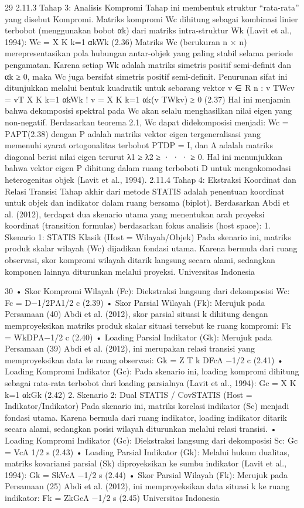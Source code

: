 29
2.11.3 Tahap 3: Analisis Kompromi
Tahap ini membentuk struktur “rata-rata” yang disebut Kompromi. Matriks kompromi
Wc dihitung sebagai kombinasi linier terbobot (menggunakan bobot αk) dari matriks
intra-struktur Wk (Lavit et al., 1994):
Wc =
X
K
k=1
αkWk (2.36)
Matriks Wc (berukuran n × n) merepresentasikan pola hubungan antar-objek yang paling
stabil selama periode pengamatan. Karena setiap Wk adalah matriks simetris positif
semi-definit dan αk ≥ 0, maka Wc juga bersifat simetris positif semi-definit. Penurunan
sifat ini ditunjukkan melalui bentuk kuadratik untuk sebarang vektor v ∈ R
n
:
v
TWcv = vT
 X
K
k=1
αkWk
!
v =
X
K
k=1
αk(v
TWkv) ≥ 0 (2.37)
Hal ini menjamin bahwa dekomposisi spektral pada Wc akan selalu menghasilkan nilai
eigen yang non-negatif. Berdasarkan teorema 2.1, Wc dapat didekomposisi menjadi:
Wc = PΛPT(2.38)
dengan P adalah matriks vektor eigen tergeneralisasi yang memenuhi syarat ortogonalitas
terbobot PTDP = I, dan Λ adalah matriks diagonal berisi nilai eigen terurut λ1 ≥ λ2 ≥
· · · ≥ 0. Hal ini menunjukkan bahwa vektor eigen P dihitung dalam ruang terboboti D
untuk mengakomodasi heterogenitas objek (Lavit et al., 1994).
2.11.4 Tahap 4: Ekstraksi Koordinat dan Relasi Transisi
Tahap akhir dari metode STATIS adalah penentuan koordinat untuk objek dan indikator
dalam ruang bersama (biplot). Berdasarkan Abdi et al. (2012), terdapat dua skenario utama
yang menentukan arah proyeksi koordinat (transition formulas) berdasarkan fokus analisis
(host space):
1. Skenario 1: STATIS Klasik (Host = Wilayah/Objek)
Pada skenario ini, matriks produk skalar wilayah (Wc) dijadikan fondasi utama.
Karena bermula dari ruang observasi, skor kompromi wilayah ditarik langsung
secara alami, sedangkan komponen lainnya diturunkan melalui proyeksi.
Universitas Indonesia

30
• Skor Kompromi Wilayah (Fc): Diekstraksi langsung dari dekomposisi Wc:
Fc = D−1/2PΛ1/2
c
(2.39)
• Skor Parsial Wilayah (Fk): Merujuk pada Persamaan (40) Abdi et al. (2012),
skor parsial situasi k dihitung dengan memproyeksikan matriks produk skalar
situasi tersebut ke ruang kompromi:
Fk = WkDPΛ−1/2
c
(2.40)
• Loading Parsial Indikator (Gk): Merujuk pada Persamaan (39) Abdi et al.
(2012), ini merupakan relasi transisi yang memproyeksikan data ke ruang
observasi:
Gk = Z
T
k DFcΛ
−1/2
c
(2.41)
• Loading Kompromi Indikator (Gc): Pada skenario ini, loading kompromi
dihitung sebagai rata-rata terbobot dari loading parsialnya (Lavit et al., 1994):
Gc =
X
K
k=1
αkGk (2.42)
2. Skenario 2: Dual STATIS / CovSTATIS (Host = Indikator/Indikator)
Pada skenario ini, matriks korelasi indikator (Sc) menjadi fondasi utama. Karena
bermula dari ruang indikator, loading indikator ditarik secara alami, sedangkan
posisi wilayah diturunkan melalui relasi transisi.
• Loading Kompromi Indikator (Gc): Diekstraksi langsung dari dekomposisi
Sc:
Gc = VcΛ
1/2
s
(2.43)
• Loading Parsial Indikator (Gk): Melalui hukum dualitas, matriks kovariansi
parsial (Sk) diproyeksikan ke sumbu indikator (Lavit et al., 1994):
Gk = SkVcΛ
−1/2
s
(2.44)
• Skor Parsial Wilayah (Fk): Merujuk pada Persamaan (25) Abdi et al. (2012),
ini memproyeksikan data situasi k ke ruang indikator:
Fk = ZkGcΛ
−1/2
s
(2.45)
Universitas Indonesia

